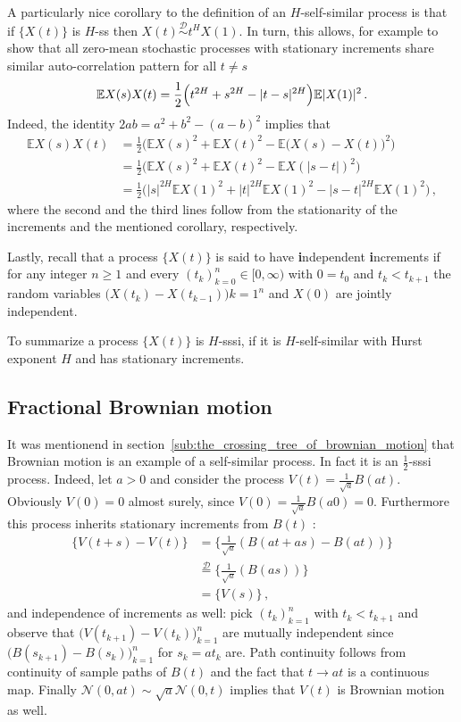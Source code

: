 \documentclass[a4paper]{article}
\newcommand{\ex}{\mathbb{E}}
\newcommand{\Dcal}{\mathcal{D}}
\begin{document}
A particularly nice corollary to the definition of an $H$-self-similar process is that
if $\bigl\{X(t)\bigr\}$ is $H$-ss then $X(t)\overset{\Dcal}{\sim}t^H X(1)$. In turn,
this allows, for example to show that all zero-mean stochastic processes with stationary
increments share similar auto-correlation pattern for all $t\neq s$
\[ \ex X(s) X(t) = \frac{1}{2}\Bigl( t^{2H} + s^{2H} - |t-s|^{2H}\Bigr) \ex|X(1)|^2 \,. \]
Indeed, the identity $2 a b = a^2 + b^2 - (a-b)^2$ implies that\begin{align*}
	\ex X(s) X(t)
	&= \frac{1}{2}\biggl( \ex X(s)^2 + \ex X(t)^2 - \ex\bigl( X(s) - X(t) \bigr)^2 \biggr) \\
	&= \frac{1}{2}\biggl( \ex X(s)^2 + \ex X(t)^2 - \ex X(|s-t|)^2 \biggr) \\
	&= \frac{1}{2}\biggl( |s|^{2H} \ex X(1)^2 + |t|^{2H} \ex X(1)^2 - |s-t|^{2H} \ex X(1)^2 \biggr) \,,
\end{align*}
where the second and the third lines follow from the stationarity of the increments
and the mentioned corollary, respectively.

Lastly, recall that a process $\bigl\{X(t)\bigr\}$ is said to have \textbf{i}ndependent
\textbf{i}ncrements if for any integer $n\geq1$ and every $(t_k)_{k=0}^n\in[0,\infty)$
with $0=t_0$ and $t_k < t_{k+1}$ the random variables $\bigl(X(t_k) - X(t_{k-1})\bigr){k=1}^n$
and $X(0)$ are jointly independent.

To summarize a process $\bigl\{X(t)\bigr\}$ is $H$-sssi, if it is $H$-self-similar
with Hurst exponent $H$ and has stationary increments.


\subsection{Fractional Brownian motion} %
\label{sub:fractional_brownian_motion}

It was mentionend in section~\ref{sub:the_crossing_tree_of_brownian_motion} that Brownian
motion is an example of a self-similar process. In fact it is an $\frac{1}{2}$-sssi process.
Indeed, let $a>0$ and consider the process $V(t) = \frac{1}{\sqrt{a}} B(at)$. Obviously
$V(0) = 0$ almost surely, since $V(0) = \frac{1}{\sqrt{a}} B(a 0) = 0$. Furthermore
this process inherits stationary increments from $B(t)$ : \begin{align*}
	\{ V(t+s) - V(t) \} &= \biggl\{ \frac{1}{\sqrt{a}}( B(at+as) - B(at) ) \biggr\}\\
	&\overset{\Dcal}{=} \biggl\{ \frac{1}{\sqrt{a}}( B(as) ) \biggr\} \\
	&= \{ V(s) \} \,,
\end{align*}
and independence of increments as well: pick $(t_k)_{k=1}^n$ with $t_k<t_{k+1}$ and
observe that $\bigl(V(t_{k+1}) - V(t_k)\bigr)_{k=1}^n$ are mutually independent since
$\bigl(B(s_{k+1}) - B(s_k)\bigr)_{k=1}^n$ for $s_k = a t_k$ are. Path continuity follows
from continuity of sample paths of $B(t)$ and the fact that $t\to a t$ is a continuous
map.  Finally $\mathcal{N}(0, at) \sim \sqrt{a} \mathcal{N}(0,t)$ implies that $V(t)$
is Brownian motion as well.
\end{document}
